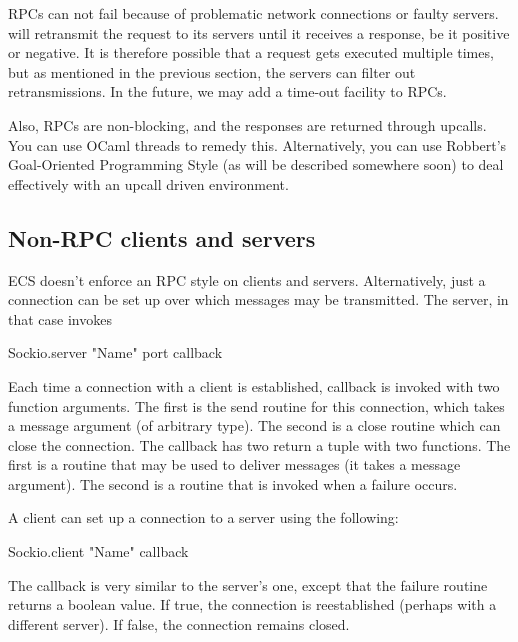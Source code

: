 RPCs can not fail because of problematic network connections or faulty servers.
 will retransmit the request to its servers until it receives a
response, be it positive or negative.  It is therefore possible that a request gets
executed multiple times, but as mentioned in the previous section, the servers can
filter out retransmissions.  In the future, we may add a time-out facility to RPCs.

Also, RPCs are non-blocking, and the responses are returned through upcalls.  You can
use OCaml threads to remedy this.  Alternatively, you can use Robbert's Goal-Oriented
Programming Style (as will be described somewhere soon) to deal effectively with an
upcall driven environment.

\subsection{Non-RPC clients and servers}

ECS doesn't enforce an RPC style on clients and servers.  Alternatively, just a
connection can be set up over which messages may be transmitted.  The server, in
that case invokes

\begin{codebox}
  Sockio.server "Name" port callback
\end{codebox}

Each time a connection with a client is established, callback is invoked with two
function arguments.  The first is the send routine for this connection, which takes a
message argument (of arbitrary type).  The second is a close routine which can close
the connection.  The callback has two return a tuple with two functions.  The first
is a routine that may be used to deliver messages (it takes a message argument).  The
second is a routine that is invoked when a failure occurs.

A client can set up a connection to a server using the following:
\begin{codebox}
  Sockio.client "Name" callback
\end{codebox}

The callback is very similar to the server's one, except that the failure routine
returns a boolean value.  If true, the connection is reestablished (perhaps with a
different server).  If false, the connection remains closed.
